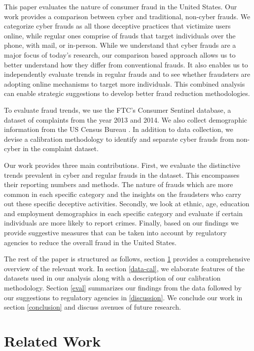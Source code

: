 \documentclass[conference]{IEEEtran}
\begin{document}
This paper evaluates the nature of consumer fraud in the United States. Our work provides a comparison between cyber and traditional, non-cyber frauds. We categorize cyber frauds as all those deceptive practices that victimize users online, while regular ones comprise of frauds that target individuals over the phone, with mail, or in-person. While we understand that cyber frauds are a major focus of today's research, our comparison based approach allows us to better understand how they differ from conventional frauds. It also enables us to independently evaluate trends in regular frauds and to see whether fraudsters are adopting online mechanisms to target more individuals. This combined analysis can enable strategic suggestions to develop better fraud reduction methodologies.

To evaluate fraud trends, we use the FTC's Consumer Sentinel database, a dataset of complaints from the year 2013 and 2014. We also collect demographic information from the US Census Bureau \cite{uscensus}. In addition to data collection, we devise a calibration methodology to identify and separate cyber frauds from non-cyber in the complaint dataset. 

Our work provides three main contributions. First, we evaluate the distinctive trends prevalent in cyber and regular frauds in the dataset. This encompasses their reporting numbers and methods. The nature of frauds which are more common in each specific category and the insights on the fraudsters who carry out these specific deceptive activities. Secondly, we look at ethnic, age, education and employment demographics in each specific category and evaluate if certain individuals are more likely to report crimes. Finally, based on our findings we provide suggestive measures that can be taken into account by regulatory agencies to reduce the overall fraud in the United States.

The rest of the paper is structured as follows, section \ref{related} provides a comprehensive overview of the relevant work. In section \ref{data-cal}, we elaborate features of the datasets used in our analysis along with a description of our calibration methodology. Section \ref{eval} summarizes our findings from the data followed by our suggestions to regulatory agencies in \ref{discussion}. We conclude our work in section \ref{conclusion} and discuss avenues of future research.


\section{Related Work}\label{related}
\end{document}
